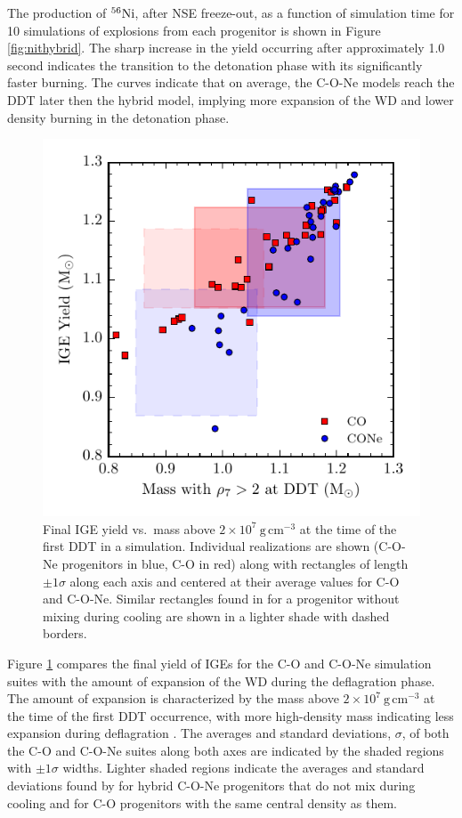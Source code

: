 \documentclass[preprint2]{aastex63}
\newcommand{\Ni}[1]{\ensuremath{{}^{#1}{\rm Ni}}}
\newcommand{\unitspace}{\ensuremath{\,}}
\newcommand{\usp}{\unitspace}
\newcommand{\unitstyle}[1]{\ensuremath{\mathrm{#1}}}
\newcommand{\power}[2]{\ensuremath{{#1}^{#2}}}
\newcommand{\centi}{\unitstyle{c}}
\newcommand{\meter}{\unitstyle{m}}
\newcommand{\cm}{\centi\meter}
\newcommand{\gram}{\unitstyle{g}}
\newcommand{\grampercc}{\gram\usp\power{\cm}{-3}} %
\begin{document}
The production of \Ni{56}, after NSE freeze-out, as a function of simulation time
for 10 simulations of explosions from each progenitor is shown in Figure \ref{fig:nithybrid}.
{\color{blue} The sharp increase in the yield occurring after approximately 1.0 second indicates
the transition to the detonation phase with its significantly faster burning. The curves
indicate that on average, the C-O-Ne models reach the DDT later then the hybrid model, 
implying more expansion of the WD and lower density burning in the detonation phase.}

\begin{figure}
\includegraphics[width=\columnwidth]{figures/ige_v_mass_at_high_dens.pdf}
\caption{\label{fig:masshighdens}
Final IGE yield
vs.\ mass above $2\times 10^7~\grampercc$
at the time of the first DDT in a simulation.  Individual
realizations are shown (C-O-Ne
progenitors in blue, C-O in red) along with rectangles of length
$\pm 1 \sigma$ along each axis and centered at their average values
for C-O and C-O-Ne.  Similar rectangles found in \citet{willcoxetal2016} for a progenitor without
mixing during cooling are shown in a lighter shade with dashed borders.
}
\end{figure}

Figure \ref{fig:masshighdens} compares the final yield of IGEs
for the C-O and C-O-Ne simulation suites with the amount of expansion of the
WD during the deflagration phase. The amount of expansion is
characterized by the mass above $2 \times 10^7~\grampercc$ at the
time of the first DDT occurrence, with more high-density mass
indicating less expansion during deflagration \citep{townetal2009}.
The averages and standard deviations, $\sigma$, of both
the C-O and C-O-Ne suites along both axes are indicated by the shaded
regions with $\pm1\sigma$ widths.
Lighter shaded regions indicate the averages and standard deviations found by \citet{willcoxetal2016} for hybrid C-O-Ne progenitors that do not mix during cooling and for C-O progenitors with the same central density as them.
\end{document}
